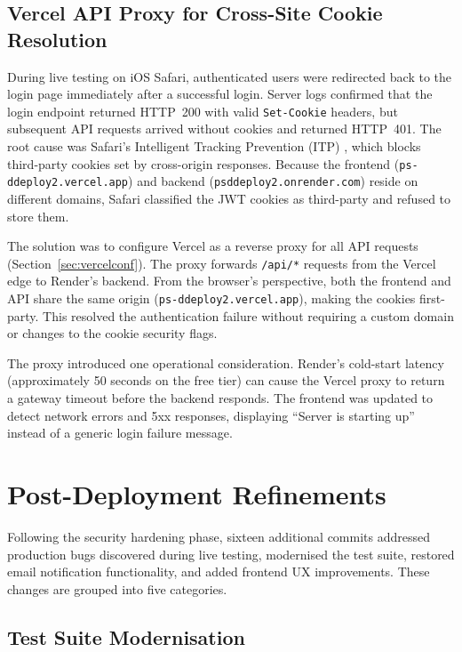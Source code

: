 \documentclass[conference]{IEEEtran}
\begin{document}
\subsection{Vercel API Proxy for Cross-Site Cookie Resolution}
\label{sec:safari-proxy}

During live testing on iOS Safari, authenticated users were redirected back to the login page immediately after a successful login. Server logs confirmed that the login endpoint returned HTTP~200 with valid \texttt{Set-Cookie} headers, but subsequent API requests arrived without cookies and returned HTTP~401. The root cause was Safari's Intelligent Tracking Prevention (ITP) \cite{b12}, which blocks third-party cookies set by cross-origin responses. Because the frontend (\texttt{ps-ddeploy2.vercel.app}) and backend (\texttt{psddeploy2.onrender.com}) reside on different domains, Safari classified the JWT cookies as third-party and refused to store them.

The solution was to configure Vercel as a reverse proxy for all API requests (Section~\ref{sec:vercelconf}). The proxy forwards \texttt{/api/*} requests from the Vercel edge to Render's backend. From the browser's perspective, both the frontend and API share the same origin (\texttt{ps-ddeploy2.vercel.app}), making the cookies first-party. This resolved the authentication failure without requiring a custom domain or changes to the cookie security flags.

The proxy introduced one operational consideration. Render's cold-start latency (approximately 50 seconds on the free tier) can cause the Vercel proxy to return a gateway timeout before the backend responds. The frontend was updated to detect network errors and 5xx responses, displaying ``Server is starting up'' instead of a generic login failure message.

\section{Post-Deployment Refinements}
\label{sec:post-deploy}

Following the security hardening phase, sixteen additional commits addressed production bugs discovered during live testing, modernised the test suite, restored email notification functionality, and added frontend UX improvements. These changes are grouped into five categories.

\subsection{Test Suite Modernisation}
\end{document}
